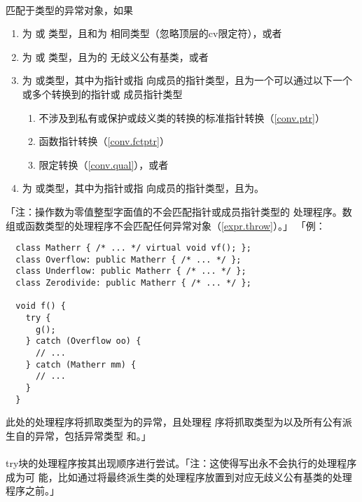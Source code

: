 \paragraph{}
匹配于类型的异常对象，如果
\begin{enumerate}
  \item{为 或 类型，且和为
    相同类型（忽略顶层的cv限定符），或者}
  \item{为 或 类型，且为的
    无歧义公有基类，或者}
  \item{为 或类型，其中为指针或指
    向成员的指针类型，且为一个可以通过以下一个或多个转换到的指针或
    成员指针类型
    \begin{enumerate}
      \item{不涉及到私有或保护或歧义类的转换的标准指针转换（\ref{conv.ptr}）}
      \item{函数指针转换（\ref{conv.fctptr}）}
      \item{限定转换（\ref{conv.qual}），或者}
    \end{enumerate}}
  \item{为 或类型，其中为指针或指
    向成员的指针类型，且为。}
\end{enumerate}
「注：操作数为零值整型字面值的不会匹配指针或成员指针类型的
处理程序。数组或函数类型的处理程序不会匹配任何异常对象（\ref{expr.throw}）。」
「例：
\begin{lstlisting}
  class Matherr { /* ... */ virtual void vf(); };
  class Overflow: public Matherr { /* ... */ };
  class Underflow: public Matherr { /* ... */ };
  class Zerodivide: public Matherr { /* ... */ };

  void f() {
    try {
      g();
    } catch (Overflow oo) {
      // ...
    } catch (Matherr mm) {
      // ...
    }
  }
\end{lstlisting}
此处的处理程序将抓取类型为的异常，且处理程
序将抓取类型为以及所有公有派生自的异常，包括异常类型
和。」

\paragraph{}
try块的处理程序按其出现顺序进行尝试。「注：这使得写出永不会执行的处理程序成为可
能，比如通过将最终派生类的处理程序放置到对应无歧义公有基类的处理程序之前。」

